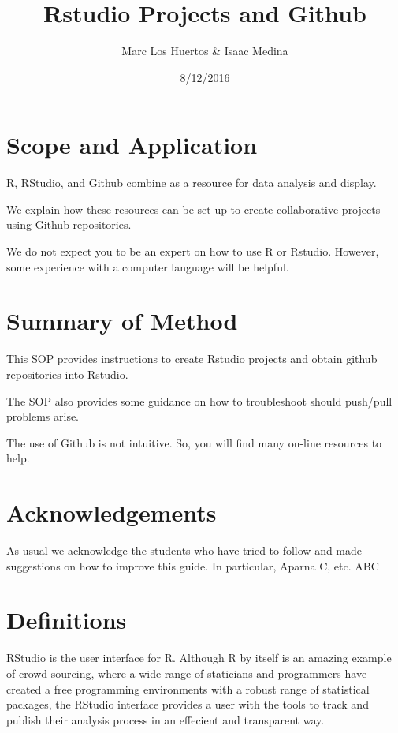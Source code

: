 \documentclass[12pt]{../SOP3_beta}
\author{Marc Los Huertos \& Isaac Medina}
\title{Rstudio Projects and Github}
\date{8/12/2016}
\begin{document}

\maketitle

\section{Scope and Application}

\NP R, RStudio, and Github combine as a resource for data analysis and display.

\NP We explain how these resources can be set up to create collaborative projects using Github repositories. 

\NP We do not expect you to be an expert on how to use R or Rstudio. However, some experience with a computer language will be helpful. 

\section{Summary of Method}

\NP This SOP provides instructions to create Rstudio projects and obtain github repositories into Rstudio. 

\NP The SOP also provides some guidance on how to troubleshoot should push/pull problems arise.

\NP The use of Github is not intuitive. So, you will find many on-line resources to help.

\tableofcontents

\newpage

\section{Acknowledgements}

As usual we acknowledge the students who have tried to follow and made suggestions on how to improve this guide. In particular, Aparna C, etc. ABC

\section{Definitions}

\NP RStudio is the user interface for R. Although R by itself is an amazing example of crowd sourcing, where a wide range of staticians and programmers have created a free programming environments with a robust range of statistical packages, the RStudio interface provides a user with the tools to track and publish their analysis process in an effecient and transparent way. 
\end{document}
